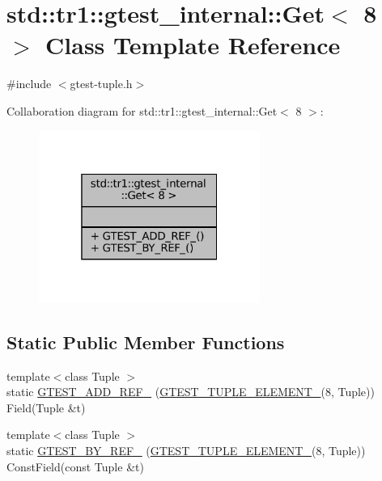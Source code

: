 \hypertarget{classstd_1_1tr1_1_1gtest__internal_1_1Get_3_018_01_4}{}\section{std\+:\+:tr1\+:\+:gtest\+\_\+internal\+:\+:Get$<$ 8 $>$ Class Template Reference}
\label{classstd_1_1tr1_1_1gtest__internal_1_1Get_3_018_01_4}


{\ttfamily \#include $<$gtest-\/tuple.\+h$>$}



Collaboration diagram for std\+:\+:tr1\+:\+:gtest\+\_\+internal\+:\+:Get$<$ 8 $>$\+:
\nopagebreak
\begin{figure}[H]
\begin{center}
\leavevmode
\includegraphics[width=205pt]{classstd_1_1tr1_1_1gtest__internal_1_1Get_3_018_01_4__coll__graph}
\end{center}
\end{figure}
\subsection*{Static Public Member Functions}
\begin{DoxyCompactItemize}
\item 
{\footnotesize template$<$class Tuple $>$ }\\static \hyperlink{classstd_1_1tr1_1_1gtest__internal_1_1Get_3_018_01_4_adf667300b7efed278f4ee3bf4d2edb85}{G\+T\+E\+S\+T\+\_\+\+A\+D\+D\+\_\+\+R\+E\+F\+\_\+} (\hyperlink{gtest-tuple_8h_a1b7f133d8aa02e0b7afed7b66781eeb7}{G\+T\+E\+S\+T\+\_\+\+T\+U\+P\+L\+E\+\_\+\+E\+L\+E\+M\+E\+N\+T\+\_\+}(8, Tuple)) Field(Tuple \&t)
\item 
{\footnotesize template$<$class Tuple $>$ }\\static \hyperlink{classstd_1_1tr1_1_1gtest__internal_1_1Get_3_018_01_4_ab9645513ad2f983157f4062c89e910e7}{G\+T\+E\+S\+T\+\_\+\+B\+Y\+\_\+\+R\+E\+F\+\_\+} (\hyperlink{gtest-tuple_8h_a1b7f133d8aa02e0b7afed7b66781eeb7}{G\+T\+E\+S\+T\+\_\+\+T\+U\+P\+L\+E\+\_\+\+E\+L\+E\+M\+E\+N\+T\+\_\+}(8, Tuple)) Const\+Field(const Tuple \&t)
\end{DoxyCompactItemize}


